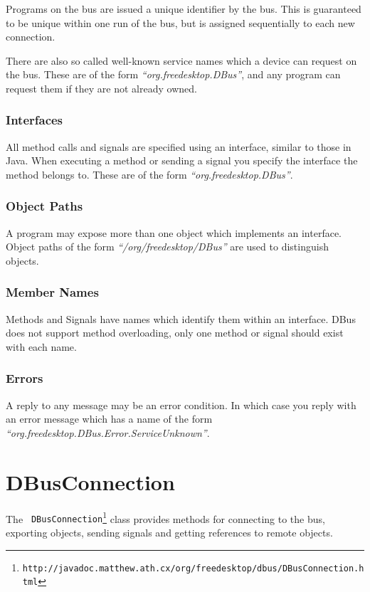 \documentclass[a4paper,12pt]{article}
\begin{document}
Programs on the bus are issued a unique identifier by the bus. This
is guaranteed to be unique within one run of the bus, but is
assigned sequentially to each new connection. 

There are also so called well-known service names which a device can
request on the bus. These are of the form {\em ``org.freedesktop.DBus''},
and any program can request them if they are not already owned.

\subsubsection{Interfaces}

All method calls and signals are specified using an interface,
similar to those in Java. When executing a method or sending a
signal you specify the interface the method belongs to. These are of
the form {\em ``org.freedesktop.DBus''}.

\subsubsection{Object Paths}

A program may expose more than one object which implements an
interface. Object paths of the form {\em ``/org/freedesktop/DBus''}
are used to distinguish objects.

\subsubsection{Member Names}

Methods and Signals have names which identify them within an
interface. DBus does not support method overloading, only one
method or signal should exist with each name.

\subsubsection{Errors}

A reply to any message may be an error condition. In which case you reply with
an error message which has a name of the form {\em
   ``org.freedesktop.DBus.Error.ServiceUnknown''}. 

\section{DBusConnection}

The {\tt
DBusConnection\footnote{http://javadoc.matthew.ath.cx/org/freedesktop/dbus/DBusConnection.html}}
class provides methods for connecting to the bus, exporting objects,
sending signals and getting references to remote objects.
\end{document}
